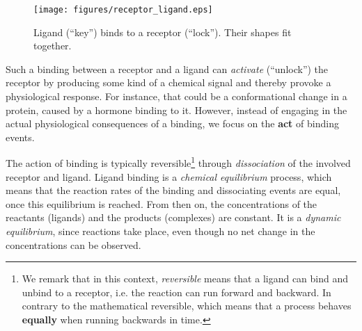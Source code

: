 \begin{figure}[!ht]
	\centering
	\texttt{[image: figures/receptor\_ligand.eps]}
	\caption{Ligand (``key'') binds to a receptor (``lock''). Their shapes fit together.}
	\label{fig:Protein_ligand_binding}
\end{figure}

Such a binding between a receptor and a ligand can \textit{activate} (``unlock'') the receptor by producing some kind of a chemical signal and thereby provoke a physiological response.
For instance, that could be a conformational change in a protein, caused by a hormone binding to it.
However, instead of engaging in the actual physiological consequences of a binding, we focus on the \textbf{act} of binding events.

The action of binding is typically reversible\footnote{We remark that in this context, \textit{reversible} means that a ligand can bind and unbind to a receptor, i.e. the reaction can run forward and backward.
In contrary to the mathematical reversible, which means that a process behaves \textbf{equally} when running backwards in time.} through \textit{dissociation} of the involved receptor and ligand.
Ligand binding is a \textit{chemical equilibrium} process, which means that the reaction rates of the binding and dissociating events are equal, once this equilibrium is reached.
From then on, the concentrations of the reactants (ligands) and the products (complexes) are constant.
It is a \textit{dynamic equilibrium}, since reactions take place, even though no net change in the concentrations can be observed.

